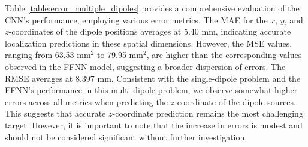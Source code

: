 \documentclass[a4paper, UKenglish, 11pt]{uiomaster}
\begin{document}
Table \ref{table:error_multiple_dipoles} provides a comprehensive evaluation of the CNN's performance, employing various error metrics. The MAE for the $x$, $y$, and $z$-coordinates of the dipole positions averages at 5.40 mm, indicating accurate localization predictions in these spatial dimensions. However, the MSE values, ranging from 63.53 mm$^2$ to 79.95 mm$^2$, are higher than the corresponding values observed in the FFNN model, suggesting a broader dispersion of errors. The RMSE averages at 8.397 mm. Consistent with the single-dipole problem and the FFNN's performance in this multi-dipole problem, we observe somewhat higher errors across all metrics when predicting the $z$-coordinate of the dipole sources. This suggests that accurate $z$-coordinate prediction remains the most challenging target. However, it is important to note that the increase in errors is modest and should not be considered significant without further investigation.
\end{document}
